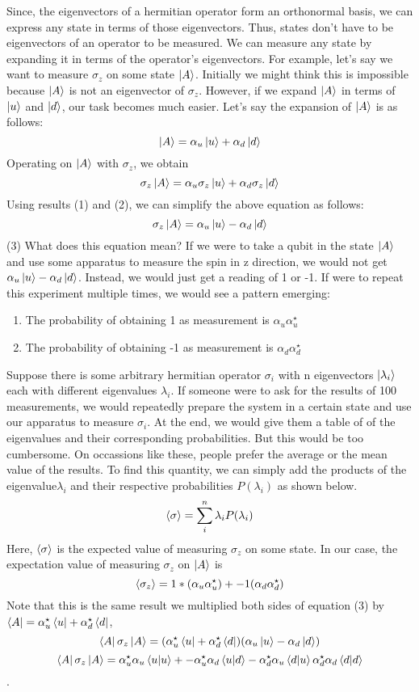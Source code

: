 \documentclass{article}
\begin{document}
  Since, the eigenvectors of a hermitian operator form an orthonormal basis,
  we can express any state in terms of those eigenvectors. Thus, states don't
  have to be eigenvectors of an operator to be measured. We can measure any state
  by expanding it in terms of the operator's eigenvectors.
  For example, let's say we want to measure \(\sigma_z\) on some state
  \(\ket{A}\). Initially we might think this is impossible because \(\ket{A}\) is
  not an eigenvector of \(\sigma_z\). However, if we expand \(\ket{A}\) in
  terms of \(\ket{u}\) and \(\ket{d}\), our task becomes much easier. Let's
  say the expansion of \(\ket{A}\) is as follows:
  \[\ket{A} = \alpha_u\ket{u} + \alpha_d\ket{d}\]
  Operating on \(\ket{A}\) with \(\sigma_z\), we obtain
  \[\sigma_z\ket{A}= \alpha_u\sigma_z\ket{u} + \alpha_d\sigma_z\ket{d}\]
  Using results (1) and (2), we can simplify the above equation as follows:
  \[\sigma_z\ket{A}= \alpha_u\ket{u} - \alpha_d\ket{d}\]             (3)
  What does this equation mean? If we were to take a qubit in the state
  \(\ket{A}\) and use some apparatus to measure the spin in z direction,
  we would not get \(\alpha_u\ket{u} - \alpha_d\ket{d}\). Instead, we would
  just get a reading of 1 or -1. If were to repeat this experiment multiple
  times, we would see a pattern emerging:
  \begin{enumerate}
    \item The probability of obtaining 1 as measurement is \(\alpha_u\alpha_u^{\star}\)
    \item The probability of obtaining -1 as measurement is \(\alpha_d\alpha_d^{\star}\)
  \end{enumerate}

  Suppose there is some arbitrary hermitian operator \(\sigma_i\) with n eigenvectors
   \(\ket{\lambda_i}\) each with different eigenvalues \(\lambda_i\). If
  someone were to ask for the results of 100 measurements, we would repeatedly
  prepare the system in a certain state and use our apparatus to measure \(\sigma_i\).
  At the end, we would give them a table of
  of the eigenvalues and their corresponding probabilities. But this
  would be too cumbersome. On occassions like these, people prefer the average or the
  mean value of the results. To find this quantity, we can simply add
  the products of the eigenvalue\(\lambda_i\) and their respective probabilities
  \(P(\lambda_i)\) as shown below.
  \[\expval{\sigma} = \sum_{i}^{n} \lambda_i P(\lambda_i)\]
  Here, \(\expval{\sigma}\) is the expected value of measuring \(\sigma_z\)
  on some state. In our case,
  the expectation value of measuring \(\sigma_z\) on \(\ket{A}\) is
  \[\expval{\sigma_z} = 1*(\alpha_u\alpha_u^{\star}) + -1(\alpha_d\alpha_d^{\star})\]
  Note that this is the same result we multiplied both sides of equation (3)
  by \(\bra{A} = \alpha_{u}^{\star}\bra{u} + \alpha_{d}^{\star}\bra{d}\),
  \[\bra{A}\sigma_z\ket{A} =(\alpha_{u}^{\star}\bra{u} + \alpha_{d}^{\star}\bra{d})(\alpha_u\ket{u} - \alpha_d\ket{d}) \]
  \[\bra{A}\sigma_z\ket{A} = \alpha_{u}^{\star}\alpha_{u}\bra{u}\ket{u} +
  - \alpha_{u}^{\star}\alpha_{d}\bra{u}\ket{d} - \alpha_{d}^{\star}\alpha_{u}\bra{d}\ket{u}
  \alpha_{d}^{\star}\alpha_{d}\bra{d}\ket{d}\].
\end{document}
